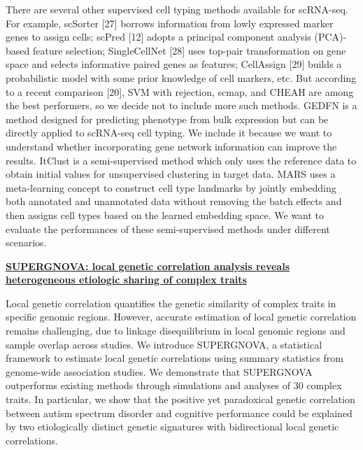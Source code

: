 \documentclass[
]{book}
\begin{document}
There are several other supervised cell typing methods available for scRNA-seq. For example, scSorter {[}27{]} borrows information from lowly expressed marker genes to assign cells; scPred {[}12{]} adopts a principal component analysis (PCA)-based feature selection; SingleCellNet {[}28{]} uses top-pair transformation on gene space and selects informative paired genes as features; CellAssign {[}29{]} builds a probabilistic model with some prior knowledge of cell markers, etc. But according to a recent comparison {[}20{]}, SVM with rejection, scmap, and CHEAH are among the best performers, so we decide not to include more such methods. GEDFN is a method designed for predicting phenotype from bulk expression but can be directly applied to scRNA-seq cell typing. We include it because we want to understand whether incorporating gene network information can improve the results. ItClust is a semi-supervised method which only uses the reference data to obtain initial values for unsupervised clustering in target data. MARS uses a meta-learning concept to construct cell type landmarks by jointly embedding both annotated and unannotated data without removing the batch effects and then assigns cell types based on the learned embedding space. We want to evaluate the performances of these semi-supervised methods under different scenarios.

\textbf{\href{https://genomebiology.biomedcentral.com/articles/10.1186/s13059-021-02478-w}{SUPERGNOVA: local genetic correlation analysis reveals heterogeneous etiologic sharing of complex traits}\citep{zhang2021supergnova}}

Local genetic correlation quantifies the genetic similarity of complex traits in specific genomic regions. However, accurate estimation of local genetic correlation remains challenging, due to linkage disequilibrium in local genomic regions and sample overlap across studies. We introduce SUPERGNOVA, a statistical framework to estimate local genetic correlations using summary statistics from genome-wide association studies. We demonstrate that SUPERGNOVA outperforms existing methods through simulations and analyses of 30 complex traits. In particular, we show that the positive yet paradoxical genetic correlation between autism spectrum disorder and cognitive performance could be explained by two etiologically distinct genetic signatures with bidirectional local genetic correlations.
\end{document}
